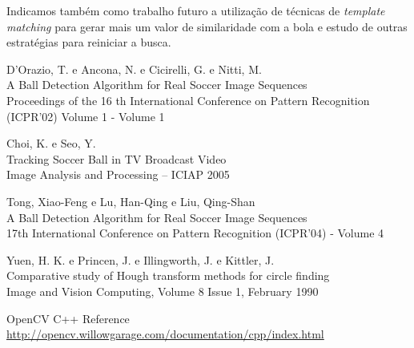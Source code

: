 \documentclass[11pt,a4paper]{article}
\begin{document}
 Indicamos também como trabalho futuro a utilização de técnicas de \textit{template matching} para gerar mais um valor de similaridade com a bola e estudo de outras estratégias para reiniciar a busca.

\begin{thebibliography}{99}

 D'Orazio, T. e Ancona, N. e Cicirelli, G. e Nitti, M.\\
 A Ball Detection Algorithm for Real Soccer Image Sequences\\
 Proceedings of the 16 th International Conference on Pattern Recognition (ICPR'02) Volume 1 - Volume 1

 Choi, K. e Seo, Y.\\
 Tracking Soccer Ball in TV Broadcast Video\\
 Image Analysis and Processing – ICIAP 2005

 Tong, Xiao-Feng e Lu, Han-Qing e Liu, Qing-Shan\\
 A Ball Detection Algorithm for Real Soccer Image Sequences\\
 17th International Conference on Pattern Recognition (ICPR'04) - Volume 4

 Yuen, H. K. e Princen, J. e Illingworth, J. e Kittler, J.\\
 Comparative study of Hough transform methods for circle finding\\
 Image and Vision Computing, Volume 8 Issue 1, February 1990 

 OpenCV C++ Reference\\
 \url{http://opencv.willowgarage.com/documentation/cpp/index.html}

\end{thebibliography}
\end{document}
